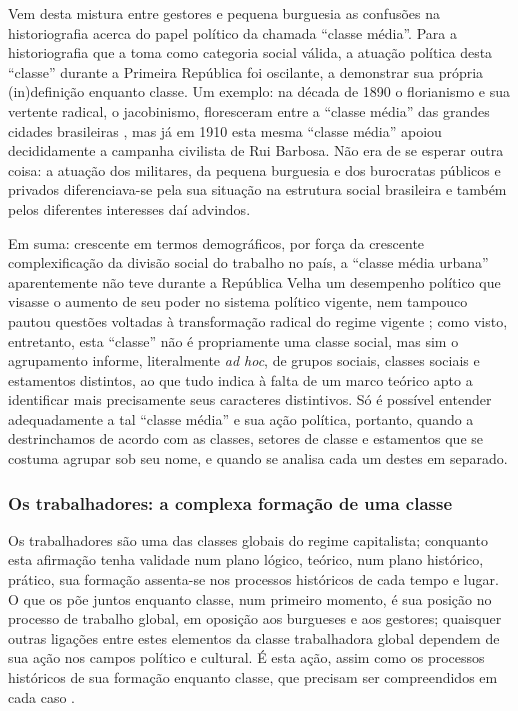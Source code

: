 Vem desta mistura entre gestores e pequena burguesia as confusões na historiografia acerca do papel político da chamada ``classe média''. Para a historiografia que a toma como categoria social válida, a atuação política desta ``classe'' durante a Primeira República foi oscilante, a demonstrar sua própria (in)definição enquanto classe. Um exemplo: na década de 1890 o florianismo e sua vertente radical, o jacobinismo, floresceram entre a ``classe média'' das grandes cidades brasileiras \cite{queiroz_radicais_1986}, mas já em 1910 esta mesma ``classe média'' apoiou decididamente a campanha civilista de Rui Barbosa. Não era de se esperar outra coisa: a atuação dos militares, da pequena burguesia e dos burocratas públicos e privados diferenciava-se pela sua situação na estrutura social brasileira e também pelos diferentes interesses daí advindos. 

Em suma: crescente em termos demográficos, por força da crescente complexificação da divisão social do trabalho no país, a ``classe média urbana'' aparentemente não teve durante a República Velha um desempenho político que visasse o aumento de seu poder no sistema político vigente, nem tampouco pautou questões voltadas à transformação radical do regime vigente \cite[p.~36]{pinheiro_clamed_1977}; como visto, entretanto, esta ``classe'' não é propriamente uma classe social, mas sim o agrupamento informe, literalmente \textit{ad hoc}, de grupos sociais, classes sociais e estamentos distintos, ao que tudo indica à falta de um marco teórico apto a identificar mais precisamente seus caracteres distintivos. Só é possível entender adequadamente a tal ``classe média'' e sua ação política, portanto, quando a destrinchamos de acordo com as classes, setores de classe e estamentos que se costuma agrupar sob seu nome, e quando se analisa cada um destes em separado.

\subsubsection{Os trabalhadores: a complexa formação de uma classe}\label{subsubsec:clatrab}

Os trabalhadores são uma das classes globais do regime capitalista; conquanto esta afirmação tenha validade num plano lógico, teórico, num plano histórico, prático, sua formação assenta-se nos processos históricos de cada tempo e lugar. O que os põe juntos enquanto classe, num primeiro momento, é sua posição no processo de trabalho global, em oposição aos burgueses e aos gestores; quaisquer outras ligações entre estes elementos da classe trabalhadora global dependem de sua ação nos campos político e cultural. É esta ação, assim como os processos históricos de sua formação enquanto classe, que precisam ser compreendidos em cada caso \cite{aguiar_classe_2009}.

